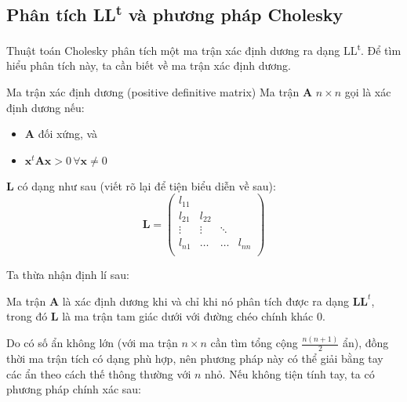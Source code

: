 \documentclass[../../Lectures]{subfiles}
\begin{document}
\newcommand{\LLt}{LL\textsuperscript{t}}
\subsection{Phân tích \texorpdfstring{\LLt}{} và phương pháp Cholesky}

Thuật toán Cholesky phân tích một ma trận xác định dương ra dạng \LLt. Để tìm
hiểu phân tích này, ta cần biết về ma trận xác định dương.

\begin{cdefinition}{Ma trận xác định dương (positive definitive matrix)}{}
    Ma trận \(\bm{A}\) \(n \times n\) gọi là xác định dương nếu:
    \begin{itemize}
        \item \(\bm{A}\) đối xứng, và
        \item \(\bm{x}^t \bm{A} \bm{x} > 0 \, \forall \bm{x} \neq 0\)
    \end{itemize}
\end{cdefinition}

\(\bm{L}\) có dạng như sau (viết rõ lại để tiện biểu diễn về sau):
\[
    \bm{L} =
        \begin{pmatrix}
            l_{11}  &          &          &        \\
            l_{21}  &  l_{22}  &          &        \\
            \vdots  &  \vdots  &  \ddots  &        \\
            l_{n1}  &  \dots   &  \dots   &  l_{nn}\\
        \end{pmatrix}
\]

Ta thừa nhận định lí sau:

\begin{ctheorem}{}{}
    Ma trận \(\bm{A}\) là xác định dương khi và chỉ khi nó phân tích được ra
    dạng \(\bm{L} \bm{L}^t\), trong đó \(\bm{L}\) là ma trận tam giác dưới với
    đường chéo chính khác \(0\).
\end{ctheorem}

Do có số ẩn không lớn (với ma trận \(n \times n\) cần tìm tổng cộng \(\frac{n(n
+ 1)}{2}\) ẩn), đồng thời ma trận tích có dạng phù hợp, nên phương pháp này có
thể giải bằng tay các ẩn theo cách thế thông thường với \(n\) nhỏ. Nếu không
tiện tính tay, ta có phương pháp chính xác sau:
\end{document}
